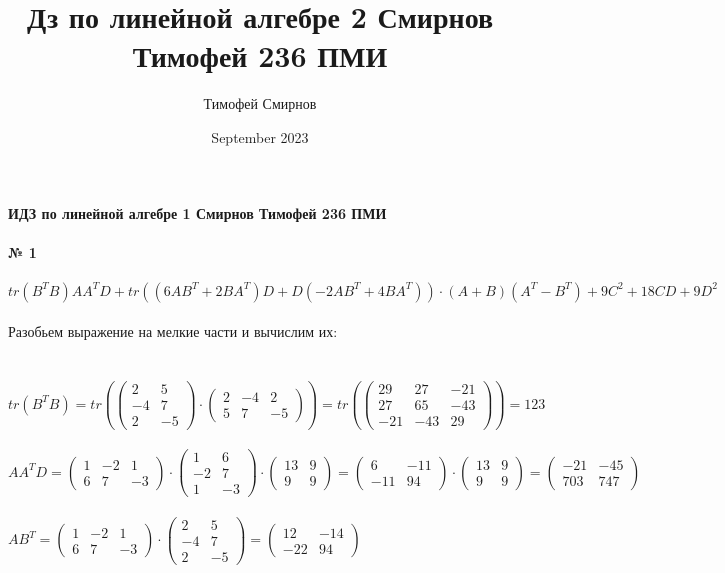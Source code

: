 \documentclass[a4paper, 12pt]{article}
\title{Дз по линейной алгебре 2 Смирнов Тимофей 236 ПМИ}
\author{Тимофей Смирнов}
\date{September 2023}
\begin{document}
    {\center \bf \large ИДЗ по линейной алгебре 1 Смирнов Тимофей 236 ПМИ}
    \\
    \\ \textbf{№ 1}
    \\
    \\ $tr(B^TB)AA^TD + tr((6AB^T + 2BA^T)D + D(-2AB^T + 4BA^T)) \cdot (A + B)(A^T - B^T) + 9C^2 + 18CD + 9D^2$
    \\
    \\ Разобьем выражение на мелкие части и вычислим их:
    \\
    \\
    \\ $tr(B^TB) = tr(\begin{pmatrix} 2 & 5 \\ -4 & 7 \\ 2 & -5 \end{pmatrix} \cdot \begin{pmatrix} 2 & -4 & 2 \\ 5 & 7 & -5 \end{pmatrix}) = tr(\begin{pmatrix}29 & 27 & -21\\27 & 65 & -43\\-21 & -43 & 29\end{pmatrix}) = 123$
    \\
    \\ $AA^TD = \begin{pmatrix} 1 & -2 & 1 \\ 6 & 7 & -3 \end{pmatrix} \cdot \begin{pmatrix} 1 & 6 \\ -2 & 7 \\ 1 & -3 \end{pmatrix} \cdot \begin{pmatrix} 13 & 9 \\ 9 & 9\end{pmatrix} = \begin{pmatrix}6 & -11\\-11 & 94\end{pmatrix} \cdot \begin{pmatrix} 13 & 9 \\ 9 & 9\end{pmatrix} = \begin{pmatrix}-21 & -45\\703 & 747\end{pmatrix}$
    \\
    \\ $AB^T = \begin{pmatrix} 1 & -2 & 1 \\ 6 & 7 & -3 \end{pmatrix} \cdot \begin{pmatrix} 2 & 5 \\ -4 & 7 \\ 2 & -5 \end{pmatrix} = \begin{pmatrix}12 & -14\\-22 & 94\end{pmatrix}$
\end{document}
